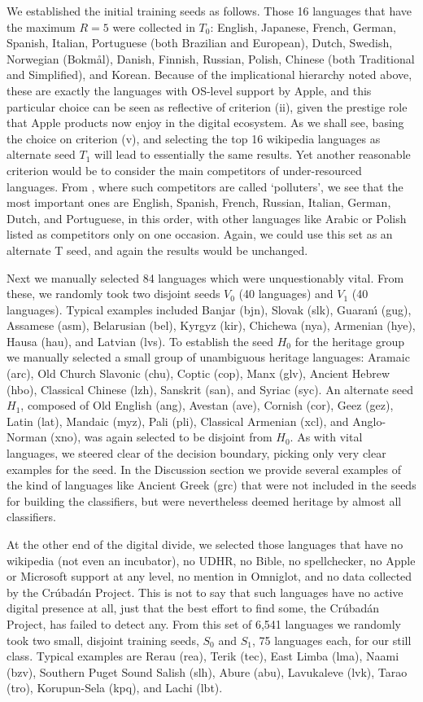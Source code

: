 \documentclass[10pt]{article}
\begin{document}
We established the initial training seeds as follows. Those 16 languages that
have the maximum $R=5$ were collected in $T_0$: English, Japanese,
French, German, Spanish, Italian, Portuguese (both Brazilian and European),
Dutch, Swedish, Norwegian (Bokm\aa l), Danish, Finnish, Russian, Polish,
Chinese (both Traditional and Simplified), and Korean. Because of the
implicational hierarchy noted above, these are exactly the languages with
OS-level support by Apple, and this particular choice can be seen as
reflective of criterion (ii), given the prestige role that Apple products now
enjoy in the digital ecosystem. As we shall see, basing the choice on
criterion (v), and selecting the top 16 wikipedia languages as alternate seed
$T_1$ will lead to essentially the same results. Yet another reasonable
criterion would be to consider the main competitors of under-resourced
languages. From \cite{Scannell:2007}, where such competitors are called
`polluters', we see that the most important ones are English, Spanish, French,
Russian, Italian, German, Dutch, and Portuguese, in this order, with other
languages like Arabic or Polish listed as competitors only on one
occasion. Again, we could use this set as an alternate T seed, and again
the results would be unchanged.

Next we manually selected 84 languages which were unquestionably vital. From
these, we randomly took two disjoint seeds $V_0$ (40 languages) and $V_1$ (40
languages). Typical examples included Banjar (bjn), Slovak (slk), Guaran\'\i
(gug), Assamese (asm), Belarusian (bel), Kyrgyz (kir), Chichewa (nya),
Armenian (hye), Hausa (hau), and Latvian (lvs).  To establish the seed
$H_0$ for the heritage group we manually selected a small group of unambiguous
heritage languages: Aramaic (arc), Old Church Slavonic (chu), Coptic (cop),
Manx (glv), Ancient Hebrew (hbo), Classical Chinese (lzh), Sanskrit (san), and
Syriac (syc).  An alternate seed $H_1$, composed of Old English (ang), Avestan
(ave), Cornish (cor), Geez (gez), Latin (lat), Mandaic (myz), Pali (pli),
Classical Armenian (xcl), and Anglo-Norman (xno), was again selected to be
disjoint from $H_0$. As with vital languages, we steered clear of the decision
boundary, picking only very clear examples for the seed. In the Discussion
section we provide several examples of the kind of languages like Ancient
Greek (grc) that were not included in the seeds for building the classifiers,
but were nevertheless deemed heritage by almost all classifiers.

At the other end of the digital divide, we selected those languages that have
no wikipedia (not even an incubator), no UDHR, no Bible, no spellchecker, no
Apple or Microsoft support at any level, no mention in Omniglot, and no data
collected by the Cr\'ubad\'an Project. This is not to say that such languages
have no active digital presence at all, just that the best effort to find
some, the Cr\'ubad\'an Project, has failed to detect any. From this set of
6,541 languages we randomly took two small, disjoint training seeds, $S_0$ and
$S_1$, 75 languages each, for our {\color{black} still} class. Typical
examples are Rerau (rea), Terik (tec), East Limba (lma), Naami (bzv), Southern
Puget Sound Salish (slh), Abure (abu), Lavukaleve (lvk), Tarao (tro),
Korupun-Sela (kpq), and Lachi (lbt). 
\end{document}
